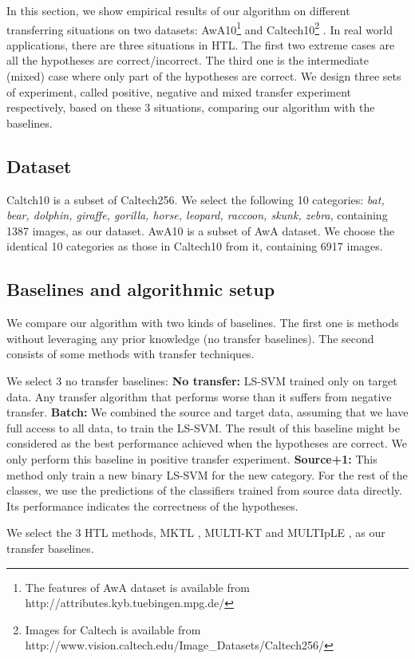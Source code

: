 In this section, we show empirical results of our algorithm on different transferring situations on two datasets: AwA10\footnote{The features of AwA dataset is available from http://attributes.kyb.tuebingen.mpg.de/} \cite{lampert2009learning} and Caltech10\footnote{Images for Caltech is available from http://www.vision.caltech.edu/Image\_Datasets/Caltech256/} \cite{griffin2007caltech}. In real world applications, there are three situations in HTL. The first two extreme cases are all the hypotheses are correct/incorrect. The third one is the intermediate (mixed) case where only part of the hypotheses are correct. We design three sets of experiment, called positive, negative and mixed transfer experiment respectively, based on these 3 situations, comparing our algorithm with the baselines.
\subsection{Dataset}
Caltch10 is a subset of Caltech256. We select the following 10 categories: \textit{bat, bear, dolphin, giraffe, gorilla, horse, leopard, raccoon, skunk, zebra}, containing 1387 images, as our dataset.
AwA10 is a subset of AwA dataset. We choose the identical 10 categories as those in Caltech10 from it, containing 6917 images.

\subsection{Baselines and algorithmic setup}
We compare our algorithm with two kinds of baselines. The first one is methods without leveraging any prior knowledge (no transfer baselines). The second consists of some methods with transfer techniques. 

We select 3 no transfer baselines:
\textbf{No transfer:} LS-SVM trained only on target data. Any transfer algorithm that performs worse than it suffers from negative transfer. \textbf{Batch:} We combined the source and target data, assuming that we have full access to all data, to train the LS-SVM. The result of this baseline might be considered as the best performance achieved when the hypotheses are correct. We only perform this baseline in positive transfer experiment. \textbf{Source+1:} This method only train a new binary LS-SVM for the new category. For the rest of the classes, we use the predictions of the classifiers trained from source data directly. Its performance indicates the correctness of the hypotheses.


We select the 3 HTL methods, {MKTL \cite{jie2011multiclass}}, {MULTI-KT \cite{tommasi2014learning}} and MULTIpLE \cite{kuzborskij2013n}, as our transfer baselines.

